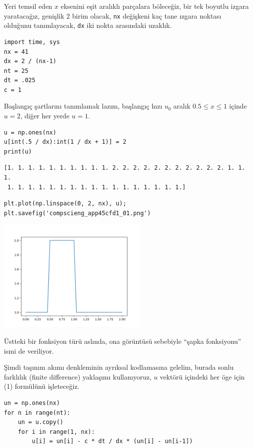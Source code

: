 \documentclass[12pt,fleqn]{article}\usepackage{../../common}
\begin{document}
Yeri temsil eden $x$ eksenini eşit aralıklı parçalara böleceğiz, bir tek boyutlu
izgara yaratacağız, genişlik 2 birim olacak, \verb!nx! değişkeni kaç tane ızgara
noktası olduğunu tanımlayacak, \verb!dx! iki nokta arasındaki uzaklık.

\begin{verbatim}
import time, sys
nx = 41
dx = 2 / (nx-1)
nt = 25  
dt = .025
c = 1    
\end{verbatim}

Başlangıç şartlarını tanımlamak lazım, başlangıç hızı $u_0$ aralık
$0.5 \leq x \leq 1$ içinde $u = 2$, diğer her yerde $u = 1$.


\begin{verbatim}
u = np.ones(nx)
u[int(.5 / dx):int(1 / dx + 1)] = 2  
print(u)
\end{verbatim}

\begin{verbatim}
[1. 1. 1. 1. 1. 1. 1. 1. 1. 1. 2. 2. 2. 2. 2. 2. 2. 2. 2. 2. 2. 1. 1. 1.
 1. 1. 1. 1. 1. 1. 1. 1. 1. 1. 1. 1. 1. 1. 1. 1. 1.]
\end{verbatim}

\begin{verbatim}
plt.plot(np.linspace(0, 2, nx), u);
plt.savefig('compscieng_app45cfd1_01.png')
\end{verbatim}

\includegraphics[width=20em]{compscieng_app45cfd1_01.png}

Üstteki bir fonksiyon türü aslında, ona görüntüsü sebebiyle ``şapka fonksiyonu''
ismi de veriliyor.

Şimdi taşınım akımı denkleminin ayrıksal kodlamasına gelelim, burada sonlu
farklılık (finite difference) yaklaşımı kullanıyoruz, $u$ vektörü içindeki her
öge için (1) formülünü işleteceğiz.

\begin{verbatim}
un = np.ones(nx)
for n in range(nt):
    un = u.copy() 
    for i in range(1, nx):
        u[i] = un[i] - c * dt / dx * (un[i] - un[i-1])        
\end{verbatim}
\end{document}
